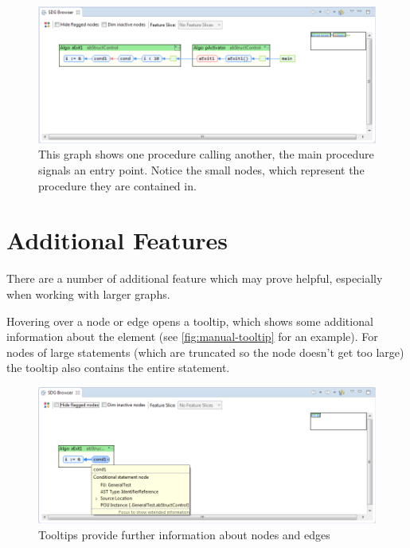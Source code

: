 \begin{figure}[hp]
  \centering
    \includegraphics[width=\textwidth]{bilder/manual-executions3}
  \caption{This graph shows one procedure calling another, the main procedure signals an entry point.
    Notice the small nodes, which represent the procedure they are contained in.}
  \label{fig:manual-executions3}
\end{figure}


\section{Additional Features} \label{sec:manual-features}


There are a number of additional feature which may prove helpful, especially when working with larger graphs.

Hovering over a node or edge opens a tooltip, which shows some additional information about the element (see 
\autoref{fig:manual-tooltip} for an example). For nodes of large statements (which are truncated so the node doesn't 
get too large) the tooltip also contains the entire statement.

\begin{figure}[hp]
  \centering
    \includegraphics[width=\textwidth]{bilder/manual-tooltip}
  \caption{Tooltips provide further information about nodes and edges}
  \label{fig:manual-tooltip}
\end{figure}

